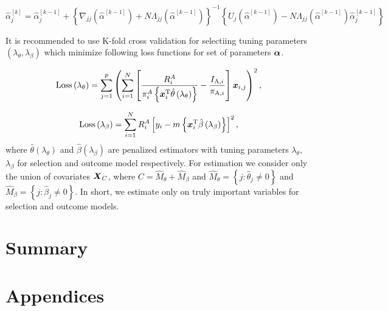 \documentclass[
  letterpaper,
  DIV=11,
  numbers=noendperiod]{scrreprt}
\begin{document}
\[
\hat{\alpha}_j^{[k]}=\hat{\alpha}_j^{[k-1]}+\left\{\nabla_{j j}\left(\hat{\alpha}^{[k-1]}\right)+N \Lambda_{j j}\left(\hat{\alpha}^{[k-1]}\right)\right\}^{-1}\left\{U_j\left(\hat{\alpha}^{[k-1]}\right)-N \Lambda_{j j}\left(\hat{\alpha}^{[k-1]}\right) \hat{\alpha}_j^{[k-1]}\right\}
\]

It is recommended to use K-fold cross validation for selectiing tuning
parameters \(\left(\lambda_{\theta}, \lambda_{\beta}\right)\) which
minimize following loss functions for set of parameters \(\boldsymbol{\alpha}\).

\[
\operatorname{Loss}\left(\lambda_\theta\right)=\sum_{j=1}^p\left(\sum_{i=1}^N\left[\frac{R_i^A}{\pi_i^A\left\{\boldsymbol{x}_i^{\mathrm{T}} \hat{\theta}\left(\lambda_\theta\right)\right\}}-\frac{I_{\mathrm{A}, i}}{\pi_{\mathrm{A}, i}}\right] \boldsymbol{x}_{i, j}\right)^2,
\]

\[
\operatorname{Loss}\left(\lambda_\beta\right)=\sum_{i=1}^N R_i^A\left[y_i-m\left\{\boldsymbol{x}_i^{\mathrm{T}} \hat{\beta}\left(\lambda_\beta\right)\right\}\right]^2,
\] where \(\hat{\theta}\left(\lambda_\theta\right)\) and
\(\hat{\beta}\left(\lambda_\beta\right)\) are penalized estimators with
tuning parameters \(\lambda_\theta\), \(\lambda_\beta\) for selection
and outcome model respectively. For estimation we consider only the
union of covariates \(\boldsymbol{X}_C\), where
\(C = \hat{M}_{\theta} + \hat{M}_{\beta}\) and
\(\hat{M}_{\theta} = \left\{j: \hat{\theta}_j \ne 0\right\}\) and
\(\hat{M}_{\beta} = \left\{j: \hat{\beta}_j \ne 0\right\}\). In short,
we estimate only on truly important variables for selection and outcome
models.


\hypertarget{summary}{%
\chapter{Summary}\label{summary}}


\hypertarget{appendices}{%
\chapter{Appendices}\label{appendices}}
\end{document}
